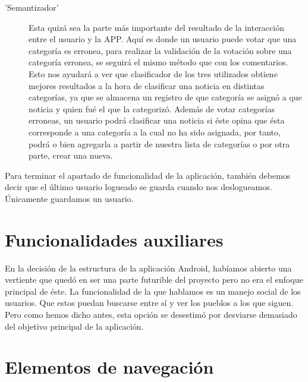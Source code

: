 \begin{description}
\begin{description}
		\item['Semantizador']
			Esta quizá sea la parte más importante del resultado de la interacción entre el usuario y la APP. Aquí es donde un usuario puede votar que una categoría es erronea, para realizar la validación de la votación sobre una categoría erronea, se seguirá el mismo método que con los comentarios. Esto nos ayudará a ver que clasificador de los tres utilizados obtiene mejores resultados a la hora de clasificar una noticia en distintas categorías, ya que se almacena un registro de que categoría se asignó a que noticia y quien fué el que la categorizó. Además de votar categorías erroneas, un usuario podrá clasificar una noticia si éste opina que ésta corresponde a una categoría a la cual no ha sido asignada, por tanto, podrá o bien agregarla a partir de nuestra lista de categorías o por otra parte, crear una nueva.
			
	\end{description}

\end{description}
Para terminar el apartado de funcionalidad de la aplicación, también debemos decir que el último usuario logueado se guarda cuando nos deslogueamos. Únicamente guardamos un usuario.

\section{Funcionalidades auxiliares}
En la decisión de la estructura de la aplicación Android, habíamos abierto una vertiente que quedó en ser una parte futurible del proyecto pero no era el enfoque principal de éste. La funcionalidad de la que hablamos es un manejo social de los usuarios. Que estos puedan buscarse entre sí y ver los pueblos a los que siguen. Pero como hemos dicho antes, esta opción se desestimó por desviarse demasiado del objetivo principal de la aplicación.	


\section{Elementos de navegación}

